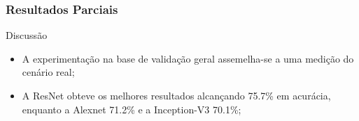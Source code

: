 \documentclass{beamer}
\begin{document}


\begin{frame}
\frametitle{Resultados Parciais}
 \begin{block}{Discussão}
\begin{itemize}
\pause
\item A experimentação na base de validação geral assemelha-se a uma medição do cenário real;
\pause
\item A ResNet obteve os melhores resultados alcançando 75.7\% em acurácia, enquanto a Alexnet 71.2\% e a Inception-V3 70.1\%;
\end{itemize}
\end{block}
\end{frame}
\end{document}
